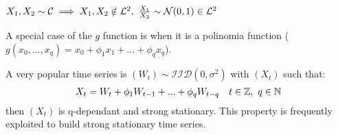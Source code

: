 \begin{example}
    $X_1,X_2\sim\mathcal{C}\implies X_1,X_2\notin\el{2},\ \frac{X_1}{X_2}\sim\mathcal{N}(0,1)\in\el{2}$
\end{example}

A special case of the $g$ function is when it is a polinomia function ($g(x_0,...,x_q)=x_0+\phi_1x_1+...+\phi_qx_q$).

\begin{example}
    A very popular time series is $(W_t)\sim\mathcal{IID}(0,\sigma^2)$ with $(X_t)$ such that:
    \[
        X_t=W_t+\phi_1W_{t-1} +...+\phi_qW_{t-q}\ \ \ t\in\mathbb{Z},\ q\in\mathbb{N}
    \] 
    then $(X_t)$ is q-dependant and strong stationary. This property is frequently exploited to build strong stationary time series.
\end{example}